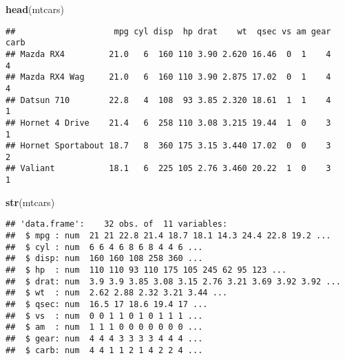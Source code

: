 \documentclass[]{article}
\newenvironment{Shaded}{\begin{snugshade}}{\end{snugshade}}
\newcommand{\KeywordTok}[1]{\textcolor[rgb]{0.13,0.29,0.53}{\textbf{#1}}}
\newcommand{\DataTypeTok}[1]{\textcolor[rgb]{0.13,0.29,0.53}{#1}}
\newcommand{\DecValTok}[1]{\textcolor[rgb]{0.00,0.00,0.81}{#1}}
\newcommand{\StringTok}[1]{\textcolor[rgb]{0.31,0.60,0.02}{#1}}
\newcommand{\OperatorTok}[1]{\textcolor[rgb]{0.81,0.36,0.00}{\textbf{#1}}}
\newcommand{\NormalTok}[1]{#1}
\begin{document}
\begin{Shaded}
\begin{Highlighting}[]
\KeywordTok{head}\NormalTok{(mtcars)}
\end{Highlighting}
\end{Shaded}

\begin{verbatim}
##                    mpg cyl disp  hp drat    wt  qsec vs am gear carb
## Mazda RX4         21.0   6  160 110 3.90 2.620 16.46  0  1    4    4
## Mazda RX4 Wag     21.0   6  160 110 3.90 2.875 17.02  0  1    4    4
## Datsun 710        22.8   4  108  93 3.85 2.320 18.61  1  1    4    1
## Hornet 4 Drive    21.4   6  258 110 3.08 3.215 19.44  1  0    3    1
## Hornet Sportabout 18.7   8  360 175 3.15 3.440 17.02  0  0    3    2
## Valiant           18.1   6  225 105 2.76 3.460 20.22  1  0    3    1
\end{verbatim}

\begin{Shaded}
\begin{Highlighting}[]
\KeywordTok{str}\NormalTok{(mtcars)}
\end{Highlighting}
\end{Shaded}

\begin{verbatim}
## 'data.frame':    32 obs. of  11 variables:
##  $ mpg : num  21 21 22.8 21.4 18.7 18.1 14.3 24.4 22.8 19.2 ...
##  $ cyl : num  6 6 4 6 8 6 8 4 4 6 ...
##  $ disp: num  160 160 108 258 360 ...
##  $ hp  : num  110 110 93 110 175 105 245 62 95 123 ...
##  $ drat: num  3.9 3.9 3.85 3.08 3.15 2.76 3.21 3.69 3.92 3.92 ...
##  $ wt  : num  2.62 2.88 2.32 3.21 3.44 ...
##  $ qsec: num  16.5 17 18.6 19.4 17 ...
##  $ vs  : num  0 0 1 1 0 1 0 1 1 1 ...
##  $ am  : num  1 1 1 0 0 0 0 0 0 0 ...
##  $ gear: num  4 4 4 3 3 3 3 4 4 4 ...
##  $ carb: num  4 4 1 1 2 1 4 2 2 4 ...
\end{verbatim}

\begin{Shaded}
\end{Shaded}
\end{document}

